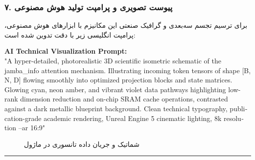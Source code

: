 \subsubsection*{۷. پیوست تصویری و پرامپت تولید هوش مصنوعی}
برای ترسیم تجسم سه‌بعدی و گرافیک صنعتی این مکانیزم با ابزارهای هوش مصنوعی، پرامپت انگلیسی زیر با دقت تدوین شده است:

\vspace{0.2cm}
\begin{latin}
\footnotesize
\textbf{AI Technical Visualization Prompt:}\\
"A hyper-detailed, photorealistic 3D scientific isometric schematic of the jamba\_info attention mechanism. Illustrating incoming token tensors of shape [B, N, D] flowing smoothly into optimized projection blocks and state matrices. Glowing cyan, neon amber, and vibrant violet data pathways highlighting low-rank dimension reduction and on-chip SRAM cache operations, contrasted against a dark metallic blueprint background. Clean technical typography, publication-grade academic rendering, Unreal Engine 5 cinematic lighting, 8k resolution --ar 16:9"
\end{latin}

\begin{figure}[H]
    \centering
    \caption{شماتیک و جریان داده تانسوری در ماژول }
    \label{fig:jamba_info}
\end{figure}

\vspace{0.5cm}
\hrule
\vspace{0.5cm}

